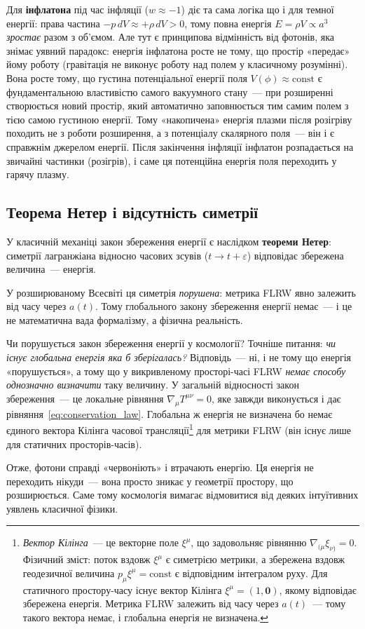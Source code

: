 Для \textbf{інфлатона} під час інфляції ($w \approx -1$)
діє та сама логіка що і для темної енергії: права
частина $-p\,dV \approx +\rho\,dV > 0$, тому повна
енергія $E = \rho V \propto a^3$ \emph{зростає} разом
з об'ємом. Але тут є принципова відмінність від
фотонів, яка знімає уявний парадокс: енергія інфлатона
росте не тому, що простір «передає» йому роботу
(гравітація не виконує роботу над полем у класичному
розумінні). Вона росте тому, що густина потенціальної
енергії поля $V(\phi) \approx \text{const}$ є
фундаментальною властивістю самого вакуумного стану~---
при розширенні створюється новий простір, який
автоматично заповнюється тим самим полем з тією самою
густиною енергії. Тому «накопичена» енергія плазми
після розігріву походить не з роботи розширення, а
з потенціалу скалярного поля~--- він і є справжнім
джерелом енергії. Після закінчення інфляції інфлатон
розпадається на звичайні частинки (розігрів), і саме
ця потенційна енергія поля переходить у гарячу плазму.

\subsection*{Теорема Нетер і відсутність симетрії}

У класичній механіці закон збереження енергії є наслідком
\textbf{теореми Нетер}: симетрії лагранжіана відносно
часових зсувів ($t \to t + \varepsilon$) відповідає
збережена величина~--- енергія.

У розширюваному Всесвіті ця симетрія \emph{порушена}:
метрика FLRW явно залежить від часу через $a(t)$.
Тому глобального закону збереження енергії немає~---
і це не математична вада формалізму, а фізична реальність.

\begin{keybox}{Чи порушується закон збереження енергії у космології?}
Точніше питання: \emph{чи існує глобальна енергія яка б
зберігалась?} Відповідь~--- ні, і не тому що енергія
«порушується», а тому що у викривленому просторі-часі
FLRW \emph{немає способу однозначно визначити} таку
величину. У загальній відносності закон збереження~---
це локальне рівняння $\nabla_\mu T^{\mu\nu} = 0$,
яке завжди виконується і дає рівняння~\eqref{eq:conservation_law}.
Глобальна ж енергія не визначена бо немає єдиного
вектора Кілінга часової трансляції\footnote{%
\emph{Вектор Кілінга}~--- це векторне поле $\xi^\mu$,
що задовольняє рівнянню $\nabla_{(\mu}\xi_{\nu)} = 0$.
Фізичний зміст: поток вздовж $\xi^\mu$ є симетрією
метрики, а збережена вздовж геодезичної величина
$p_\mu \xi^\mu = \text{const}$ є відповідним інтегралом
руху. Для статичного простору-часу існує вектор Кілінга
$\xi^\mu = (1,\mathbf{0})$, якому відповідає збережена
енергія. Метрика FLRW залежить від часу через $a(t)$~---
тому такого вектора немає, і глобальна енергія не
визначена.} для метрики FLRW
(він існує лише для статичних просторів-часів).

Отже, фотони справді «червоніють» і втрачають енергію.
Ця енергія не переходить нікуди~--- вона просто зникає
у геометрії простору, що розширюється.
Саме тому космологія вимагає відмовитися від деяких
інтуїтивних уявлень класичної фізики.
\end{keybox}

